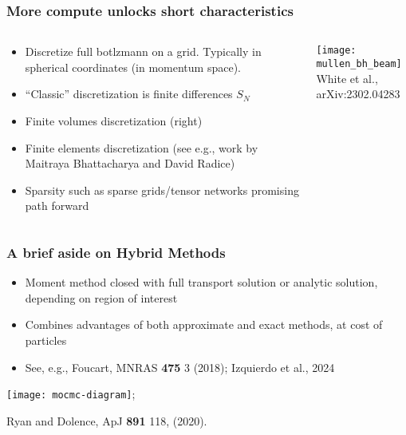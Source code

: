 \documentclass[]{beamer}
\begin{document}
\begin{frame}
  \frametitle{More compute unlocks short characteristics}
  \begin{columns}
    \begin{column}{6cm}
      \begin{itemize}
      \item Discretize full botlzmann on a grid. Typically in
        spherical coordinates (in momentum space).
      \item ``Classic'' discretization is finite differences $S_N$
      \item Finite volumes discretization (right)
      \item Finite elements discretization (see e.g., work by Maitraya
        Bhattacharya and David Radice)
      \item Sparsity such as sparse grids/tensor networks promising path forward
      \end{itemize}
    \end{column}
    \begin{column}{6cm}
      \begin{center}
        \texttt{[image: mullen\_bh\_beam]}\\
        {\footnotesize White et al., arXiv:2302.04283}
      \end{center}
    \end{column}
  \end{columns}
\end{frame}

\begin{frame}
  \frametitle{A brief aside on Hybrid Methods}
  \begin{itemize}
  \item Moment method closed with full transport solution or analytic
    solution, depending on region of interest
  \item Combines advantages of both approximate and exact methods, at
    cost of particles
  \item See, e.g., Foucart, MNRAS \textbf{475} 3 (2018); Izquierdo et al., 2024
  \end{itemize}
  \begin{center}
    \texttt{[image: mocmc-diagram]};
  \end{center}
  {\footnotesize Ryan and Dolence, ApJ \textbf{891} 118, (2020).}
\end{frame}
\end{document}
